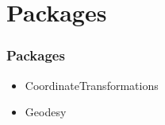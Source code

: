 \documentclass{beamer}
\newcommand{\vf}[1]{\vskip0pt plus #1}
\begin{document}



\section{Packages}

\begin{frame}
  \frametitle{Packages}
  \begin{itemize}
    \item
      CoordinateTransformations
    \item
      Geodesy
  \end{itemize}
\end{frame}
\end{document}
